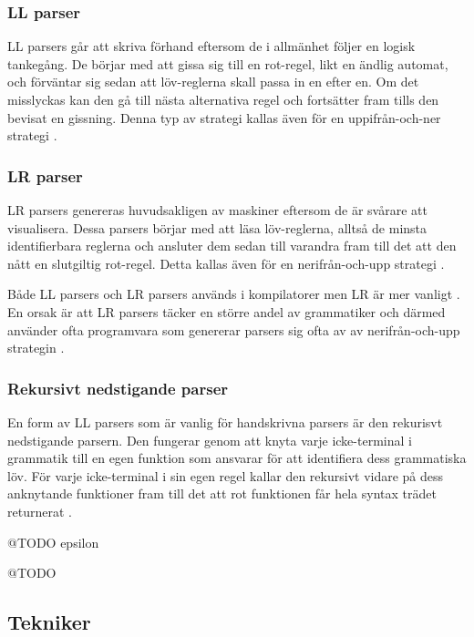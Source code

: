\subsubsection{LL parser}

LL parsers går att skriva förhand eftersom de i allmänhet följer en logisk
tankegång. De börjar med att gissa sig till en rot-regel, likt en ändlig
automat, och förväntar sig sedan att löv-reglerna skall passa in en efter en.
Om det misslyckas kan den gå till nästa alternativa regel och fortsätter
fram tills den bevisat en gissning. Denna typ av strategi kallas även för en
uppifrån-och-ner strategi \citep[s. 67]{sm09}.

\subsubsection{LR parser}

LR parsers genereras huvudsakligen av maskiner eftersom de är svårare att
visualisera. Dessa parsers börjar med att läsa löv-reglerna, alltså de minsta
identifierbara reglerna och ansluter dem sedan till varandra fram till det att
den nått en slutgiltig rot-regel. Detta kallas även för en nerifrån-och-upp
strategi \citep[s. 67]{sm09}.

Både LL parsers och LR parsers används i kompilatorer men LR är mer
vanligt \citep[s. 67]{sm09}. En orsak är att LR parsers täcker en
större andel av grammatiker och därmed använder ofta programvara som genererar
parsers sig ofta av av nerifrån-och-upp strategin \citep[s. 61]{aa06}.

\subsubsection{Rekursivt nedstigande parser}

En form av LL parsers som är vanlig för handskrivna parsers är den rekurisvt
nedstigande parsern. Den fungerar genom att knyta varje icke-terminal i
grammatik till en egen funktion som ansvarar för att identifiera dess
grammatiska löv. För varje icke-terminal i sin egen regel kallar den rekursivt
vidare på dess anknytande funktioner fram till det att rot funktionen får hela
syntax trädet returnerat \citep[s. 24]{pt10}.

@TODO epsilon

@TODO

\subsection{Tekniker}

